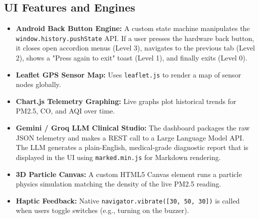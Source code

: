 \documentclass[11pt,a4paper]{article}
\begin{document}
\subsection{UI Features and Engines}
\begin{itemize}
    \item \textbf{Android Back Button Engine:} A custom state machine manipulates the \texttt{window.history.pushState} API. If a user presses the hardware back button, it closes open accordion menus (Level 3), navigates to the previous tab (Level 2), shows a "Press again to exit" toast (Level 1), and finally exits (Level 0).
    \item \textbf{Leaflet GPS Sensor Map:} Uses \texttt{leaflet.js} to render a map of sensor nodes globally.
    \item \textbf{Chart.js Telemetry Graphing:} Live graphs plot historical trends for PM2.5, CO, and AQI over time.
    \item \textbf{Gemini / Groq LLM Clinical Studio:} The dashboard packages the raw JSON telemetry and makes a REST call to a Large Language Model API. The LLM generates a plain-English, medical-grade diagnostic report that is displayed in the UI using \texttt{marked.min.js} for Markdown rendering.
    \item \textbf{3D Particle Canvas:} A custom HTML5 Canvas element runs a particle physics simulation matching the density of the live PM2.5 reading.
    \item \textbf{Haptic Feedback:} Native \texttt{navigator.vibrate([30, 50, 30])} is called when users toggle switches (e.g., turning on the buzzer).
\end{itemize}
\end{document}
